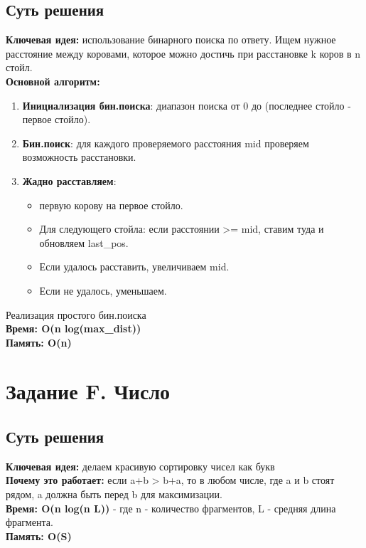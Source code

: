 \documentclass[a4paper,12pt]{article}
\begin{document}
    \subsection*{Суть решения}
    \textbf{Ключевая идея:} использование бинарного поиска по ответу. Ищем нужное расстояние между коровами, которое можно достичь при расстановке k коров в n стойл.\\
    \textbf{Основной алгоритм:}
    \begin{enumerate}
        \item \textbf{Инициализация бин.поиска}: диапазон поиска от 0 до (последнее стойло - первое стойло).
        \item \textbf{Бин.поиск}: для каждого проверяемого расстояния mid проверяем возможность расстановки.
        \item \textbf{Жадно расставляем}:
        \begin{itemize}
            \item первую корову на первое стойло.
            \item Для следующего стойла: если расстоянии >= mid, ставим туда и обновляем last\_pos.
            \item Если удалось расставить, увеличиваем mid.
            \item Если не удалось, уменьшаем.
        \end{itemize}
    \end{enumerate}
    Реализация простого бин.поиска\\
    \textbf{Время: O(n log(max\_dist))}\\
    \textbf{Память: O(n)}


    \newpage


    \section{Задание F. Число}

    

    \subsection*{Суть решения}
    \textbf{Ключевая идея:} делаем красивую сортировку чисел как букв\\
    \textbf{Почему это работает:} если a+b > b+a, то в любом числе, где a и b стоят рядом, a должна быть перед b для максимизации.\\
    \textbf{Время: O(n log(n L))} - где n - количество фрагментов, L - средняя длина фрагмента.\\
    \textbf{Память: O(S)}
\end{document}
